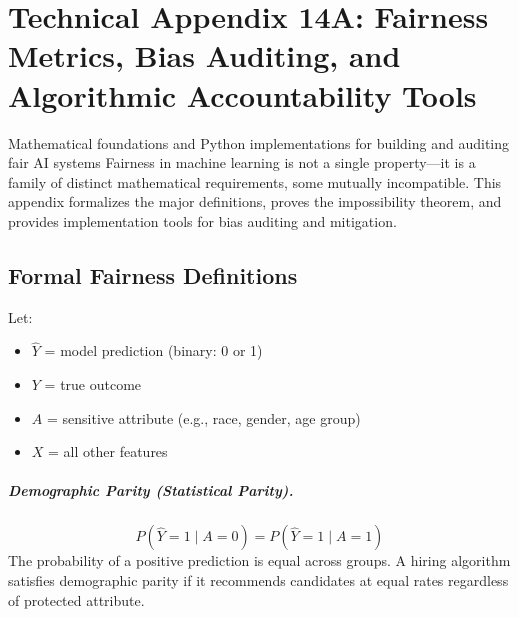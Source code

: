 
\chapter*{Technical Appendix 14A: Fairness Metrics, Bias Auditing, and Algorithmic Accountability Tools}

\begin{chapterquote}{Mathematical foundations and Python implementations for building and auditing fair AI systems}
Fairness in machine learning is not a single property---it is a family of distinct mathematical requirements, some mutually incompatible. This appendix formalizes the major definitions, proves the impossibility theorem, and provides implementation tools for bias auditing and mitigation.
\end{chapterquote}

\apxnumon
\section{Formal Fairness Definitions}
\label{sec:a14-fairness-definitions}

Let:
\begin{itemize}
    \item $\hat{Y}$ = model prediction (binary: 0 or 1)
    \item $Y$ = true outcome
    \item $A$ = sensitive attribute (e.g., race, gender, age group)
    \item $X$ = all other features
\end{itemize}

\paragraph{Demographic Parity (Statistical Parity).}
\[
P(\hat{Y} = 1 \mid A = 0) = P(\hat{Y} = 1 \mid A = 1)
\]
The probability of a positive prediction is equal across groups. A hiring algorithm satisfies demographic parity if it recommends candidates at equal rates regardless of protected attribute.

